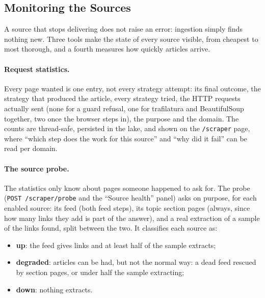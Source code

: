 
\subsection{Monitoring the Sources}
\label{subsec:scraping-observability}

A source that stops delivering does not raise an error: ingestion
simply finds nothing new. Three tools make the state of every source
visible, from cheapest to most thorough, and a fourth measures how
quickly articles arrive.

\paragraph{Request statistics.} Every page wanted is one entry, not
every strategy attempt: its final outcome, the strategy that produced
the article, every strategy tried, the HTTP requests actually sent
(none for a guard refusal, one for trafilatura and BeautifulSoup
together, two once the browser steps in), the purpose and the domain.
The counts are thread-safe, persisted in the lake, and shown on the
\texttt{/scraper} page, where ``which step does the work for this
source'' and ``why did it fail'' can be read per domain.

\paragraph{The source probe.} The statistics only know about pages
someone happened to ask for. The probe (\texttt{POST /scraper/probe}
and the ``Source health'' panel) asks on purpose, for each enabled
source: its feed (both feed steps), its topic section pages (always,
since how many links they add is part of the answer), and a real
extraction of a sample of the links found, split between the two. It
classifies each source as:

\begin{itemize}
    \item \textbf{up}: the feed gives links and at least half of the
    sample extracts;
    \item \textbf{degraded}: articles can be had, but not the normal
    way: a dead feed rescued by section pages, or under half the sample
    extracting;
    \item \textbf{down}: nothing extracts.
\end{itemize}

